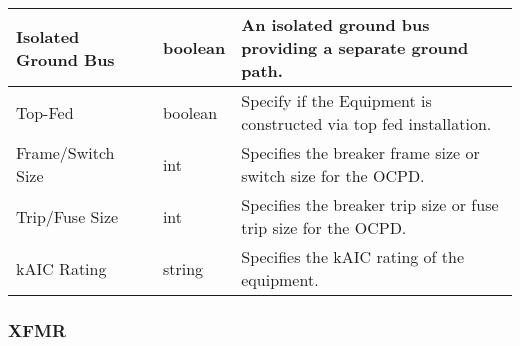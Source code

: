 \documentclass[letterpaper,10pt,english]{sphinxmanual}
\begin{document}
\begin{savenotes}
\begin{tabulary}{\linewidth}[t]{|T|T|T|}
\\
\hline
Isolated Ground Bus
&
boolean
&
An isolated ground bus providing a separate ground path.
\\
\hline
Top-Fed
&
boolean
&
Specify if the Equipment is constructed via top fed installation.
\\
\hline
Frame/Switch Size
&
int
&
Specifies the breaker frame size or switch size for the OCPD.
\\
\hline
Trip/Fuse Size
&
int
&
Specifies the breaker trip size or fuse trip size for the OCPD.
\\
\hline
kAIC Rating
&
string
&
Specifies the kAIC rating of the equipment.
\\
\hline
\end{tabulary}
\par
\sphinxattableend\end{savenotes}


\subsubsection{XFMR}
\label{\detokenize{docs/definitions/index-definitions:id9}}
\end{document}
